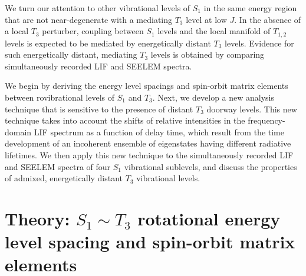 We turn our attention to other vibrational levels of $S_1$ in the same
energy region that are not near-degenerate with a mediating $T_3$
level at low $J$.  In the absence of a local $T_3$ perturber, coupling
between $S_1$ levels and the local manifold of $T_{1,2}$ levels is
expected to be mediated by energetically distant $T_3$ levels.
Evidence for such energetically distant, mediating $T_3$ levels is
obtained by comparing simultaneously recorded LIF and SEELEM spectra.

We begin by deriving the energy level spacings and spin-orbit matrix
elements between rovibrational levels of $S_1$ and $T_3$.  Next, we
develop a new analysis technique that is sensitive to the presence of
distant $T_3$ doorway levels.  This new technique takes into account
the shifts of relative intensities in the frequency-domain LIF
spectrum as a function of delay time, which result from the time
development of an incoherent ensemble of eigenstates having different
radiative lifetimes.  We then apply this new technique to the
simultaneously recorded LIF and SEELEM spectra of four $S_1$
vibrational sublevels, and discuss the properties of admixed,
energetically distant $T_3$ vibrational levels.

\section{Theory: $S_1 \sim T_3$ rotational energy level spacing and
  spin-orbit matrix elements}
\label{theory1}

